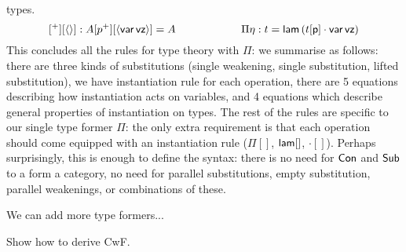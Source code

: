 \documentclass{easychair}
\begin{document}
types.
\[
[^+][\langle\rangle] : A[p^+][\langle\mathsf{var}\,\mathsf{vz}\rangle] = A \hspace{6em}\Pi\eta : t = \mathsf{lam}\,(t[\mathsf{p}]\cdot\mathsf{var}\,\mathsf{vz})
\]
This concludes all the rules for type theory with $\Pi$: we summarise
as follows: there are three kinds of substitutions (single weakening,
single substitution, lifted substitution), we have instantiation rule
for each operation, there are 5 equations describing how instantiation
acts on variables, and 4 equations which describe general properties
of instantiation on types. The rest of the rules are specific to our
single type former $\Pi$: the only extra requirement is that each
operation should come equipped with an instantiation rule ($\Pi[]$,
$\mathsf{lam}[]$, ${\cdot}[]$). Perhaps surprisingly, this is enough to define
the syntax: there is no need for $\mathsf{Con}$ and $\mathsf{Sub}$ to a form a
category, no need for parallel substitutions, empty substitution,
parallel weakenings, or combinations of these.

We can add more type formers...

Show how to derive CwF.


\label{sect:bib}

%
%
%


\end{document}
